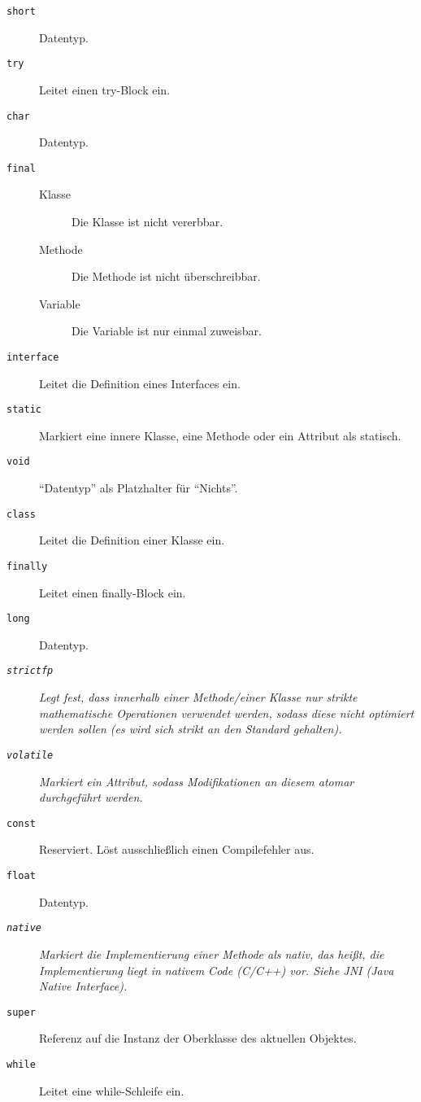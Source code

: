 \begin{description}
        \item[\texttt{short}] Datentyp.
        \item[\texttt{try}] Leitet einen try-Block ein.
        \item[\texttt{char}] Datentyp.
        \item[\texttt{final}]
	        \begin{description}
	        	\item[Klasse] Die Klasse ist nicht vererbbar.
	        	\item[Methode] Die Methode ist nicht überschreibbar.
	        	\item[Variable] Die Variable ist nur einmal zuweisbar.
	        \end{description}
        \item[\texttt{interface}] Leitet die Definition eines Interfaces ein.
        \item[\texttt{static}] Markiert eine innere Klasse, eine Methode oder ein Attribut als statisch.
        \item[\texttt{void}] \enquote{Datentyp} als Platzhalter für \enquote{Nichts}.
        \item[\texttt{class}] Leitet die Definition einer Klasse ein.
        \item[\texttt{finally}] Leitet einen finally-Block ein.
        \item[\texttt{long}] Datentyp.
        \item[\textit{\texttt{strictfp}}] \textit{Legt fest, dass innerhalb einer Methode/einer Klasse nur strikte mathematische Operationen verwendet werden, sodass diese nicht optimiert werden sollen (es wird sich strikt an den Standard gehalten).}
        \item[\textit{\texttt{volatile}}] \textit{Markiert ein Attribut, sodass Modifikationen an diesem atomar durchgeführt werden.}
        \item[\texttt{const}] Reserviert. Löst ausschließlich einen Compilefehler aus.
        \item[\texttt{float}] Datentyp.
        \item[\textit{\texttt{native}}] \textit{Markiert die Implementierung einer Methode als nativ, das heißt, die Implementierung liegt in nativem Code (C/C++) vor. Siehe JNI (Java Native Interface).}
        \item[\texttt{super}] Referenz auf die Instanz der Oberklasse des aktuellen Objektes.
        \item[\texttt{while}] Leitet eine while-Schleife ein.
	\end{description}
	

